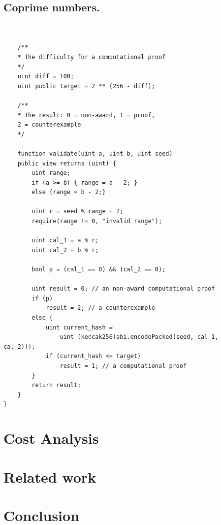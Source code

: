 \documentclass[runningheads]{llncs}
\begin{document}
\subsection{Coprime numbers.}


\begin{lstlisting}[numbers=none]


    /**
    * The difficulty for a computational proof
    */
    uint diff = 100;
    uint public target = 2 ** (256 - diff); 

    /**
    * The result: 0 = non-award, 1 = proof, 
    2 = counterexample
    */

    function validate(uint a, uint b, uint seed)
    public view returns (uint) {
        uint range;
        if (a >= b) { range = a - 2; }
        else {range = b - 2;}
        
        uint r = seed % range + 2;
        require(range != 0, "invalid range");

        uint cal_1 = a % r;
        uint cal_2 = b % r;
        
        bool p = (cal_1 == 0) && (cal_2 == 0);

        uint result = 0; // an non-award computational proof 
        if (p)  
            result = 2; // a counterexample
        else {
            uint current_hash = 
                uint (keccak256(abi.encodePacked(seed, cal_1, cal_2)));
            if (current_hash <= target) 
                result = 1; // a computational proof      
        }              
        return result;           
    }
}

\end{lstlisting}


\section{Cost Analysis}

\section{Related work}
\section{Conclusion}

%


\newpage


\end{document}
